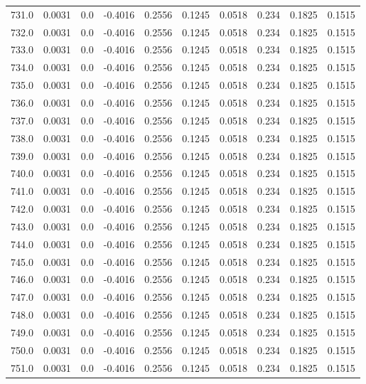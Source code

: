 \begin{longtable}{lrrrrrrrrr}
731.0 & 0.0031 & 0.0 & -0.4016 & 0.2556 & 0.1245 & 0.0518 & 0.234 & 0.1825 & 0.1515 \\
732.0 & 0.0031 & 0.0 & -0.4016 & 0.2556 & 0.1245 & 0.0518 & 0.234 & 0.1825 & 0.1515 \\
733.0 & 0.0031 & 0.0 & -0.4016 & 0.2556 & 0.1245 & 0.0518 & 0.234 & 0.1825 & 0.1515 \\
734.0 & 0.0031 & 0.0 & -0.4016 & 0.2556 & 0.1245 & 0.0518 & 0.234 & 0.1825 & 0.1515 \\
735.0 & 0.0031 & 0.0 & -0.4016 & 0.2556 & 0.1245 & 0.0518 & 0.234 & 0.1825 & 0.1515 \\
736.0 & 0.0031 & 0.0 & -0.4016 & 0.2556 & 0.1245 & 0.0518 & 0.234 & 0.1825 & 0.1515 \\
737.0 & 0.0031 & 0.0 & -0.4016 & 0.2556 & 0.1245 & 0.0518 & 0.234 & 0.1825 & 0.1515 \\
738.0 & 0.0031 & 0.0 & -0.4016 & 0.2556 & 0.1245 & 0.0518 & 0.234 & 0.1825 & 0.1515 \\
739.0 & 0.0031 & 0.0 & -0.4016 & 0.2556 & 0.1245 & 0.0518 & 0.234 & 0.1825 & 0.1515 \\
740.0 & 0.0031 & 0.0 & -0.4016 & 0.2556 & 0.1245 & 0.0518 & 0.234 & 0.1825 & 0.1515 \\
741.0 & 0.0031 & 0.0 & -0.4016 & 0.2556 & 0.1245 & 0.0518 & 0.234 & 0.1825 & 0.1515 \\
742.0 & 0.0031 & 0.0 & -0.4016 & 0.2556 & 0.1245 & 0.0518 & 0.234 & 0.1825 & 0.1515 \\
743.0 & 0.0031 & 0.0 & -0.4016 & 0.2556 & 0.1245 & 0.0518 & 0.234 & 0.1825 & 0.1515 \\
744.0 & 0.0031 & 0.0 & -0.4016 & 0.2556 & 0.1245 & 0.0518 & 0.234 & 0.1825 & 0.1515 \\
745.0 & 0.0031 & 0.0 & -0.4016 & 0.2556 & 0.1245 & 0.0518 & 0.234 & 0.1825 & 0.1515 \\
746.0 & 0.0031 & 0.0 & -0.4016 & 0.2556 & 0.1245 & 0.0518 & 0.234 & 0.1825 & 0.1515 \\
747.0 & 0.0031 & 0.0 & -0.4016 & 0.2556 & 0.1245 & 0.0518 & 0.234 & 0.1825 & 0.1515 \\
748.0 & 0.0031 & 0.0 & -0.4016 & 0.2556 & 0.1245 & 0.0518 & 0.234 & 0.1825 & 0.1515 \\
749.0 & 0.0031 & 0.0 & -0.4016 & 0.2556 & 0.1245 & 0.0518 & 0.234 & 0.1825 & 0.1515 \\
750.0 & 0.0031 & 0.0 & -0.4016 & 0.2556 & 0.1245 & 0.0518 & 0.234 & 0.1825 & 0.1515 \\
751.0 & 0.0031 & 0.0 & -0.4016 & 0.2556 & 0.1245 & 0.0518 & 0.234 & 0.1825 & 0.1515 \\

\end{longtable}
